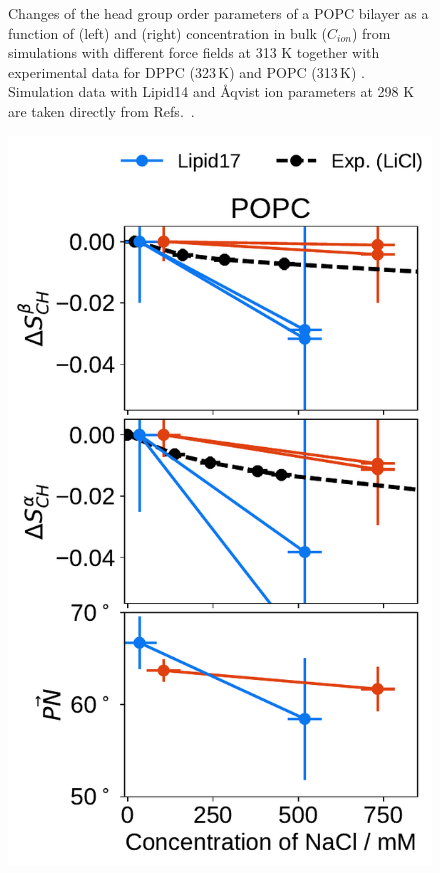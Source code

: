 \begin{figure}[tbp!]
  \caption{\label{fig:delta_ordPar_NaCl} 
    Changes of the head group order parameters of a POPC bilayer as a function of  (left) and  (right) concentration 
    in bulk ($C_{ion}$) from simulations with different force fields at 313 K together with  
    experimental data for DPPC (323\,K) \citep{akutsu81} and POPC (313\,K) \citep{altenbach84}. 
    Simulation data with Lipid14 and Åqvist ion parameters at 298 K are taken directly from 
    Refs.~\citep{lipid14POPC0mMNaClfiles,lipid14POPC1000mMNaClfiles}. 
  } 
\end{figure} 
 
 
\begin{figure}[tbp!] 
  \centering 
  \includegraphics[width=\figwidthsmall]{../img/ecc_pops/order_parameters_changes_ecc-lip_L14_A-B-PN-COO_POPC_nacl.pdf} 

\end{figure}
